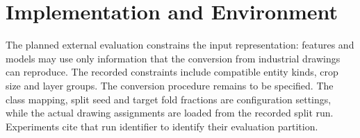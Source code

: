 \section{Implementation and Environment}
\label{sec:implementation}
The planned external evaluation constrains the input representation: features and
models may use only information that the conversion from industrial drawings can
reproduce.
The recorded constraints include compatible entity kinds, crop size and layer groups.
The conversion procedure remains to be specified.
The class mapping, split seed and target fold fractions are configuration settings, while
the actual drawing assignments are loaded from the recorded split run.
Experiments cite that run identifier to identify their evaluation partition.

